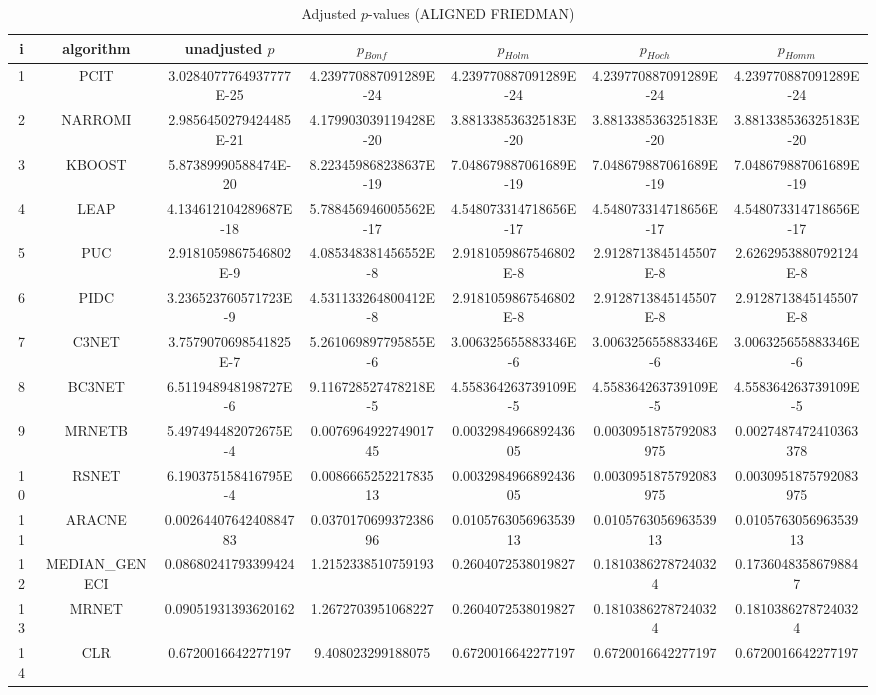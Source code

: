 \documentclass[a4paper,10pt]{article}
\begin{document}
\begin{landscape}
\begin{table}[!htp]
\centering\scriptsize
\caption{Adjusted $p$-values (ALIGNED FRIEDMAN)}
\begin{tabular}{ccccccc}
i&algorithm&unadjusted $p$&$p_{Bonf}$&$p_{Holm}$&$p_{Hoch}$&$p_{Homm}$\\
\hline
1&PCIT&3.0284077764937777E-25&4.239770887091289E-24&4.239770887091289E-24&4.239770887091289E-24&4.239770887091289E-24\\
2&NARROMI&2.9856450279424485E-21&4.179903039119428E-20&3.881338536325183E-20&3.881338536325183E-20&3.881338536325183E-20\\
3&KBOOST&5.87389990588474E-20&8.223459868238637E-19&7.048679887061689E-19&7.048679887061689E-19&7.048679887061689E-19\\
4&LEAP&4.134612104289687E-18&5.788456946005562E-17&4.548073314718656E-17&4.548073314718656E-17&4.548073314718656E-17\\
5&PUC&2.9181059867546802E-9&4.085348381456552E-8&2.9181059867546802E-8&2.9128713845145507E-8&2.6262953880792124E-8\\
6&PIDC&3.236523760571723E-9&4.531133264800412E-8&2.9181059867546802E-8&2.9128713845145507E-8&2.9128713845145507E-8\\
7&C3NET&3.7579070698541825E-7&5.261069897795855E-6&3.006325655883346E-6&3.006325655883346E-6&3.006325655883346E-6\\
8&BC3NET&6.511948948198727E-6&9.116728527478218E-5&4.558364263739109E-5&4.558364263739109E-5&4.558364263739109E-5\\
9&MRNETB&5.497494482072675E-4&0.007696492274901745&0.003298496689243605&0.0030951875792083975&0.0027487472410363378\\
10&RSNET&6.190375158416795E-4&0.008666525221783513&0.003298496689243605&0.0030951875792083975&0.0030951875792083975\\
11&ARACNE&0.0026440764240884783&0.037017069937238696&0.010576305696353913&0.010576305696353913&0.010576305696353913\\
12&MEDIAN_GENECI&0.08680241793399424&1.2152338510759193&0.2604072538019827&0.18103862787240324&0.17360483586798847\\
13&MRNET&0.09051931393620162&1.2672703951068227&0.2604072538019827&0.18103862787240324&0.18103862787240324\\
14&CLR&0.6720016642277197&9.408023299188075&0.6720016642277197&0.6720016642277197&0.6720016642277197\\
\hline
\end{tabular}
\end{table}


\end{landscape}
\end{document}
